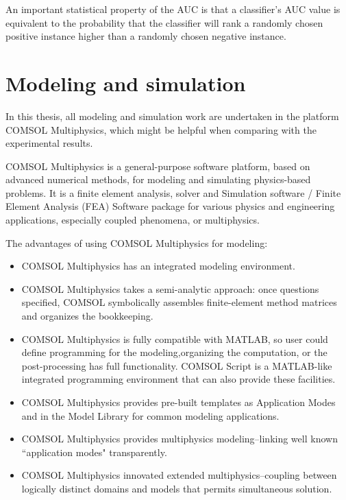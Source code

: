 An important statistical property of the AUC is that a classifier's AUC value is equivalent to the probability that the classifier will rank a randomly chosen positive instance higher than a randomly chosen negative instance. 

\section{Modeling and simulation}
In this thesis, all modeling and simulation work are undertaken in the platform COMSOL Multiphysics{\textregistered}, which might be helpful when comparing with the experimental results.

COMSOL Multiphysics is a general-purpose software platform, based on advanced numerical methods, for modeling and simulating physics-based problems. It is a finite element analysis, solver and Simulation software / Finite Element Analysis (FEA) Software package for various physics and engineering applications, especially coupled phenomena, or multiphysics.

The advantages of using COMSOL Multiphysics for modeling:
\begin{itemize}
	\item COMSOL Multiphysics has an integrated modeling environment.
	\item COMSOL Multiphysics takes a semi-analytic approach: once questions specified, COMSOL symbolically assembles finite-element method matrices and organizes the bookkeeping.
	\item COMSOL Multiphysics is fully compatible with MATLAB, so user could define programming for the modeling,organizing the computation, or the post-processing has full functionality. COMSOL Script is a MATLAB-like integrated programming environment that can also provide these facilities.
	\item COMSOL Multiphysics provides pre-built templates as Application Modes and in the Model Library for common modeling applications.
	\item COMSOL Multiphysics provides multiphysics modeling--linking well known ``application modes" transparently.
	\item COMSOL Multiphysics innovated extended multiphysics--coupling between logically distinct domains and models that permits simultaneous solution.
\end{itemize}


